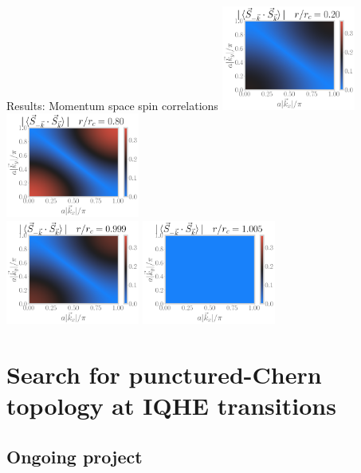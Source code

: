 \documentclass[aspectratio=169,t]{beamer}
\begin{document}
\begin{frame}{Results: Momentum space spin correlations}
\includegraphics[width=0.33\textwidth]{corr-1.png}
\includegraphics[width=0.33\textwidth]{corr-222.png}\\
\includegraphics[width=0.33\textwidth]{corr-295.png}
\includegraphics[width=0.33\textwidth]{corr-297.png}
\end{frame}

\section{Search for punctured-Chern topology at IQHE transitions}
\subsection{Ongoing project}
\end{document}
